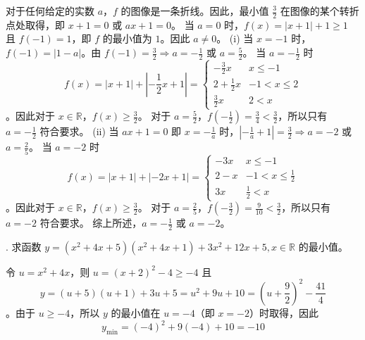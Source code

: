 \begin{questions}
\begin{solution}
对于任何给定的实数 $a$，$f$ 的图像是一条折线。因此，最小值 $\frac{3}{2}$ 在图像的某个转折点处取得，即 $x + 1 = 0$ 或 $ax + 1 = 0$。
当 $a = 0$ 时，$f(x) = |x + 1| + 1 \ge 1$ 且 $f(-1) = 1$，即 $f$ 的最小值为 $1$。因此 $a \neq 0$。
(i) 当 $x = -1$ 时，$f(-1) = |1 - a|$。由 $f(-1) = \frac{3}{2} \Rightarrow a = -\frac{1}{2}$ 或 $a = \frac{5}{2}$。
当 $a = -\frac{1}{2}$ 时
\[
f(x) = |x + 1| + \left|-\frac{1}{2}x + 1\right| = \begin{cases} -\frac{3}{2}x & x \le -1 \\ 2 + \frac{1}{2}x & -1 < x \le 2 \\ \frac{3}{2}x & 2 < x \end{cases}
\]
。因此对于 $x \in \mathbb{R}$，$f(x) \ge \frac{3}{2}$。
对于 $a = \frac{5}{2}$，$f\left(-\frac{1}{2}\right) = \frac{3}{4} < \frac{3}{2}$，所以只有 $a = -\frac{1}{2}$ 符合要求。
(ii) 当 $ax + 1 = 0$ 即 $x = -\frac{1}{a}$ 时，$\left|-\frac{1}{a} + 1\right| = \frac{3}{2} \Rightarrow a = -2$ 或 $a = \frac{2}{5}$。
当 $a = -2$ 时
\[
f(x) = |x + 1| + |-2x + 1| = \begin{cases} -3x & x \le -1 \\ 2 - x & -1 < x \le \frac{1}{2} \\ 3x & \frac{1}{2} < x \end{cases}
\]
。因此对于 $x \in \mathbb{R}$，$f(x) \ge \frac{3}{2}$。
对于 $a = \frac{2}{5}$，$f\left(-\frac{3}{2}\right) = \frac{9}{10} < \frac{3}{2}$，所以只有 $a = -2$ 符合要求。
综上所述，$a = -\frac{1}{2}$ 或 $a = -2$。
\end{solution}

. 求函数 $y = (x^2 + 4x + 5)(x^2 + 4x + 1) + 3x^2 + 12x + 5, x \in \mathbb{R}$ 的最小值。

\begin{solution}
令 $u = x^2 + 4x$，则 $u = (x + 2)^2 - 4 \ge -4$ 且
\[
y = (u + 5)(u + 1) + 3u + 5 = u^2 + 9u + 10 = \left(u + \frac{9}{2}\right)^2 - \frac{41}{4}
\]
。由于 $u \ge -4$，所以 $y$ 的最小值在 $u = -4$（即 $x = -2$）时取得，因此
\[
y_{\min} = (-4)^2 + 9(-4) + 10 = -10
\]
\end{solution}


\end{questions}
